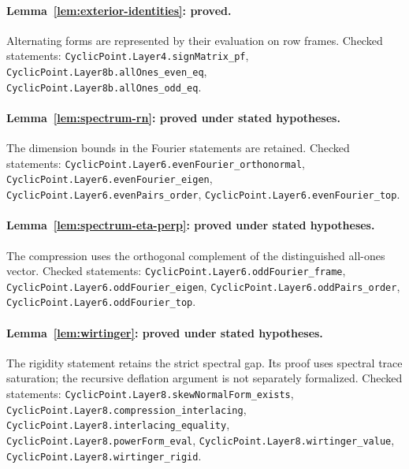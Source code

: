 \documentclass[11pt]{article}
\begin{document}
\paragraph{Lemma~\ref{lem:exterior-identities}: proved.}
Alternating forms are represented by their evaluation on row frames.
Checked statements: \texttt{CyclicPoint.\allowbreak Layer4.\allowbreak signMatrix\_\allowbreak pf}, \texttt{CyclicPoint.\allowbreak Layer8b.\allowbreak allOnes\_\allowbreak even\_\allowbreak eq}, \texttt{CyclicPoint.\allowbreak Layer8b.\allowbreak allOnes\_\allowbreak odd\_\allowbreak eq}.

\paragraph{Lemma~\ref{lem:spectrum-rn}: proved under stated hypotheses.}
The dimension bounds in the Fourier statements are retained.
Checked statements: \texttt{CyclicPoint.\allowbreak Layer6.\allowbreak evenFourier\_\allowbreak orthonormal}, \texttt{CyclicPoint.\allowbreak Layer6.\allowbreak evenFourier\_\allowbreak eigen}, \texttt{CyclicPoint.\allowbreak Layer6.\allowbreak evenPairs\_\allowbreak order}, \texttt{CyclicPoint.\allowbreak Layer6.\allowbreak evenFourier\_\allowbreak top}.

\paragraph{Lemma~\ref{lem:spectrum-eta-perp}: proved under stated hypotheses.}
The compression uses the orthogonal complement of the distinguished all-ones vector.
Checked statements: \texttt{CyclicPoint.\allowbreak Layer6.\allowbreak oddFourier\_\allowbreak frame}, \texttt{CyclicPoint.\allowbreak Layer6.\allowbreak oddFourier\_\allowbreak eigen}, \texttt{CyclicPoint.\allowbreak Layer6.\allowbreak oddPairs\_\allowbreak order}, \texttt{CyclicPoint.\allowbreak Layer6.\allowbreak oddFourier\_\allowbreak top}.

\paragraph{Lemma~\ref{lem:wirtinger}: proved under stated hypotheses.}
The rigidity statement retains the strict spectral gap. Its proof uses spectral trace saturation; the recursive deflation argument is not separately formalized.
Checked statements: \texttt{CyclicPoint.\allowbreak Layer8.\allowbreak skewNormalForm\_\allowbreak exists}, \texttt{CyclicPoint.\allowbreak Layer8.\allowbreak compression\_\allowbreak interlacing}, \texttt{CyclicPoint.\allowbreak Layer8.\allowbreak interlacing\_\allowbreak equality}, \texttt{CyclicPoint.\allowbreak Layer8.\allowbreak powerForm\_\allowbreak eval}, \texttt{CyclicPoint.\allowbreak Layer8.\allowbreak wirtinger\_\allowbreak value}, \texttt{CyclicPoint.\allowbreak Layer8.\allowbreak wirtinger\_\allowbreak rigid}.
\end{document}
